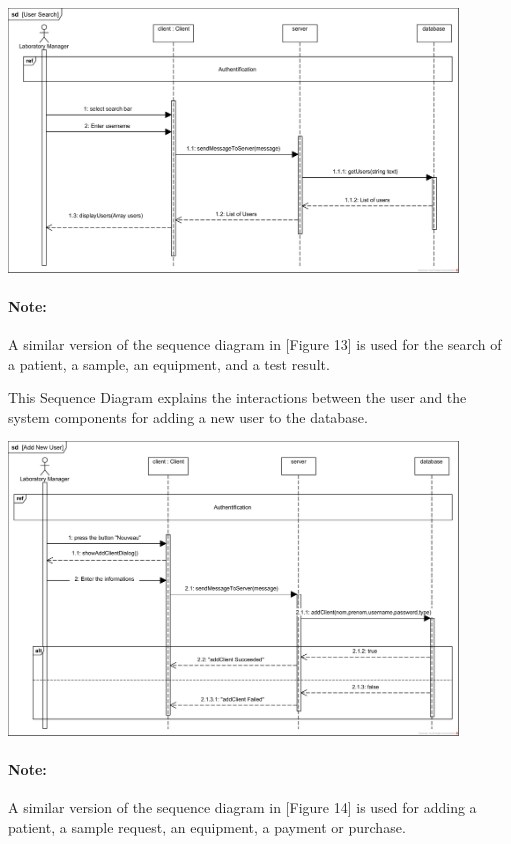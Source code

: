 \documentclass{article}
\begin{document}
\begin{center}
    \includegraphics[width=451px]{media/sequence diagrams/User Search.png}
\end{center}

\paragraph*{\textbf{Note: }} A similar version of the sequence diagram in [Figure 13] is used for the search of a patient, a sample, an equipment, and a test result.


\newpage
This Sequence Diagram explains the interactions between the user and the system components for adding a new user to the database.

\begin{center}
    \includegraphics[width=451px]{media/sequence diagrams/Add New User.png}
\end{center}

\paragraph*{\textbf{Note: }} A similar version of the sequence diagram in [Figure 14] is used for adding a patient, a sample request, an equipment, a payment or purchase.
\end{document}
